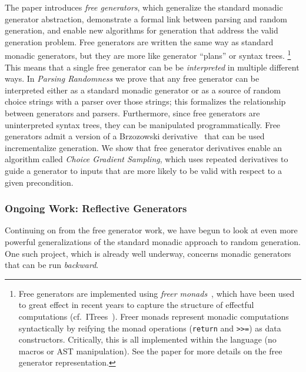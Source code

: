 The paper introduces {\em free generators}, which generalize the standard
monadic generator abstraction, demonstrate a formal link between parsing and
random generation, and enable new algorithms for generation that address the
valid generation problem. Free generators are written the same way as standard
monadic generators, but they are more like generator ``plans'' or syntax
trees.%
\footnote{Free generators are implemented using {\em freer
monads}~\cite{kiselyov2015freer}, which have been used to great effect in recent
years to capture the structure of effectful computations
(cf.~ITrees~\cite{old:xia2019interaction}). Freer monads represent
monadic 
computations syntactically by reifying the monad operations (\lstinline{return}
and \lstinline{>>=}) as data constructors. Critically, this is all implemented
within the language (no macros or AST manipulation). See the paper for more
details on the free generator representation.}
This means that a single free generator can be be {\em interpreted} in multiple
different ways. In {\em Parsing Randomness} we prove that any free generator can
  be interpreted either as a standard monadic generator or as a source of
random choice strings with a parser over those strings; this formalizes the
relationship between generators and parsers. Furthermore, since free generators
are uninterpreted syntax trees, they can be manipulated programmatically. Free
generators admit a version of a Brzozowski
derivative~\cite{brzozowski1964derivatives} that can be used incrementalize
generation. We show that free generator derivatives enable an algorithm called
{\em Choice Gradient Sampling}, which uses repeated derivatives to guide a
generator to inputs that are more likely to be valid with respect to a given
precondition.

\subsubsection{Ongoing Work: Reflective Generators}
Continuing on from the free generator work, we have begun to look at even more
powerful generalizations of the standard monadic approach to random generation.
One such project, which is already well underway, concerns monadic generators
that can be run {\em backward}.

